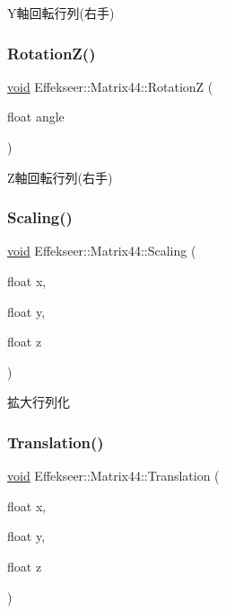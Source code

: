 Y軸回転行列(右手) 

\mbox{\label{struct_effekseer_1_1_matrix44_a07b2387e64cdcf9227ca954a48d60e9f}} 
\subsubsection{\texorpdfstring{Rotation\+Z()}{RotationZ()}}
{\footnotesize\ttfamily \mbox{\hyperlink{namespace_effekseer_ab34c4088e512200cf4c2716f168deb56}{void}} Effekseer\+::\+Matrix44\+::\+RotationZ (\begin{DoxyParamCaption}\item[{float}]{angle }\end{DoxyParamCaption})}



Z軸回転行列(右手) 

\mbox{\label{struct_effekseer_1_1_matrix44_a973c274dff2d56d5f6b8453971ffe0ba}} 
\subsubsection{\texorpdfstring{Scaling()}{Scaling()}}
{\footnotesize\ttfamily \mbox{\hyperlink{namespace_effekseer_ab34c4088e512200cf4c2716f168deb56}{void}} Effekseer\+::\+Matrix44\+::\+Scaling (\begin{DoxyParamCaption}\item[{float}]{x,  }\item[{float}]{y,  }\item[{float}]{z }\end{DoxyParamCaption})}



拡大行列化 

\mbox{\label{struct_effekseer_1_1_matrix44_af10dc0777b15b329cb33e173ce86924b}} 
\subsubsection{\texorpdfstring{Translation()}{Translation()}}
{\footnotesize\ttfamily \mbox{\hyperlink{namespace_effekseer_ab34c4088e512200cf4c2716f168deb56}{void}} Effekseer\+::\+Matrix44\+::\+Translation (\begin{DoxyParamCaption}\item[{float}]{x,  }\item[{float}]{y,  }\item[{float}]{z }\end{DoxyParamCaption})}



